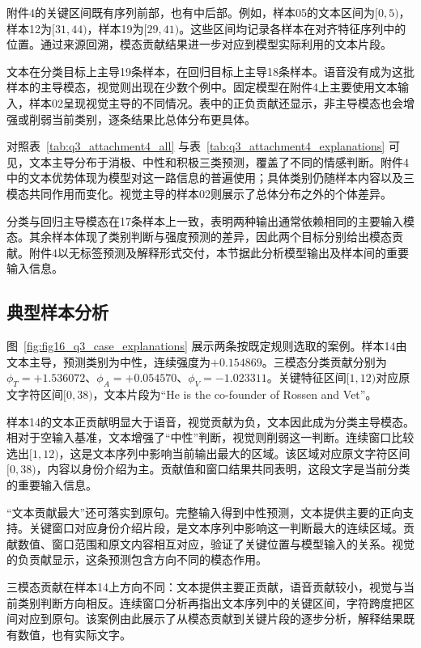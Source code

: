 附件4的关键区间既有序列前部，也有中后部。例如，样本05的文本区间为$[0,5)$，样本12为$[31,44)$，样本19为$[29,41)$。这些区间均记录各样本在对齐特征序列中的位置。通过来源回溯，模态贡献结果进一步对应到模型实际利用的文本片段。

文本在分类目标上主导19条样本，在回归目标上主导18条样本。语音没有成为这批样本的主导模态，视觉则出现在少数个例中。固定模型在附件4上主要使用文本输入，样本02呈现视觉主导的不同情况。表中的正负贡献还显示，非主导模态也会增强或削弱当前类别，逐条结果比总体分布更具体。

对照表~\ref{tab:q3_attachment4_all} 与表~\ref{tab:q3_attachment4_explanations} 可见，文本主导分布于消极、中性和积极三类预测，覆盖了不同的情感判断。附件4中的文本优势体现为模型对这一路信息的普遍使用；具体类别仍随样本内容以及三模态共同作用而变化。视觉主导的样本02则展示了总体分布之外的个体差异。

分类与回归主导模态在17条样本上一致，表明两种输出通常依赖相同的主要输入模态。其余样本体现了类别判断与强度预测的差异，因此两个目标分别给出模态贡献。附件4以无标签预测及解释形式交付，本节据此分析模型输出及样本间的重要输入信息。

\subsection{典型样本分析}\label{subsec:q3_cases}
图~\ref{fig:fig16_q3_case_explanations} 展示两条按既定规则选取的案例。样本14由文本主导，预测类别为中性，连续强度为$+0.154869$。三模态分类贡献分别为$\phi_T=+1.536072$、$\phi_A=+0.054570$、$\phi_V=-1.023311$。关键特征区间$[1,12)$对应原文字符区间$[0,38)$，文本片段为“He is the co-founder of Rossen and Vet”。

样本14的文本正贡献明显大于语音，视觉贡献为负，文本因此成为分类主导模态。相对于空输入基准，文本增强了“中性”判断，视觉则削弱这一判断。连续窗口比较选出$[1,12)$，这是文本序列中影响当前输出最大的区域。该区域对应原文字符区间$[0,38)$，内容以身份介绍为主。贡献值和窗口结果共同表明，这段文字是当前分类的重要输入信息。

“文本贡献最大”还可落实到原句。完整输入得到中性预测，文本提供主要的正向支持。关键窗口对应身份介绍片段，是文本序列中影响这一判断最大的连续区域。贡献数值、窗口范围和原文内容相互对应，验证了关键位置与模型输入的关系。视觉的负贡献显示，这条预测包含方向不同的模态作用。

三模态贡献在样本14上方向不同：文本提供主要正贡献，语音贡献较小，视觉与当前类别判断方向相反。连续窗口分析再指出文本序列中的关键区间，字符跨度把区间对应到原句。该案例由此展示了从模态贡献到关键片段的逐步分析，解释结果既有数值，也有实际文字。

